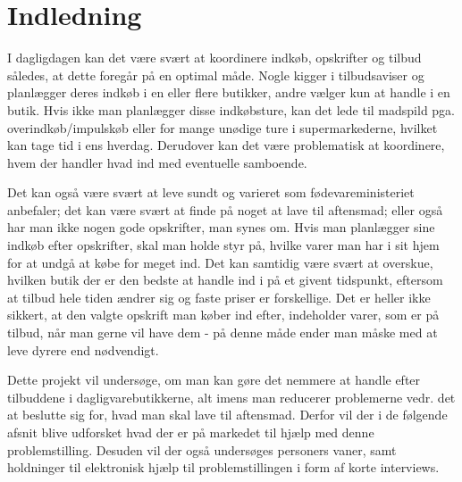 \chapter{Indledning}\label{chapter:indledning}

I dagligdagen kan det være svært at koordinere indkøb, opskrifter og tilbud således, at dette foregår på en optimal måde. Nogle kigger i tilbudsaviser og planlægger deres indkøb i en eller flere butikker, andre vælger kun at handle i en butik. Hvis ikke man planlægger disse indkøbsture, kan det lede til madspild pga. overindkøb/impulskøb eller for mange unødige ture i supermarkederne, hvilket kan tage tid i ens hverdag. Derudover kan det være problematisk at koordinere, hvem der handler hvad ind med eventuelle samboende.

Det kan også være svært at leve sundt og varieret som fødevareministeriet anbefaler; det kan være svært at finde på noget at lave til aftensmad; eller også har man ikke nogen gode opskrifter, man synes om.
Hvis man planlægger sine indkøb efter opskrifter, skal man holde styr på, hvilke varer man har i sit hjem for at undgå at købe for meget ind. Det kan samtidig være svært at overskue, hvilken butik der er den bedste at handle ind i på et givent tidspunkt, eftersom at tilbud hele tiden ændrer sig og faste priser er forskellige. Det er heller ikke sikkert, at den valgte opskrift man køber ind efter, indeholder varer, som er på tilbud, når man gerne vil have dem - på denne måde ender man måske med at leve dyrere end nødvendigt.

Dette projekt vil undersøge, om man kan gøre det nemmere at handle efter tilbuddene i dagligvarebutikkerne, alt imens man reducerer problemerne vedr. det at beslutte sig for, hvad man skal lave til aftensmad.
Derfor vil der i de følgende afsnit blive udforsket hvad der er på markedet til hjælp med denne problemstilling. Desuden vil der også undersøges personers vaner, samt holdninger til elektronisk hjælp til problemstillingen i form af korte interviews.
